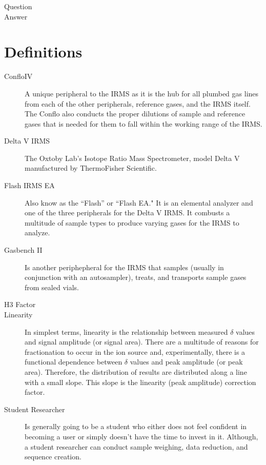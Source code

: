 \documentclass[12pt]{../SOP3}\usepackage[]{graphicx}\usepackage[]{color}
\begin{document}
\NP Question \\
Answer

\section{Definitions}

\begin{description}

\item[ConfloIV] A unique peripheral to the IRMS as it is the hub for all plumbed gas lines from each of the other peripherals, reference gases, and the IRMS itself. The Conflo also conducts the proper dilutions of sample and reference gases that is needed for them to fall within the working range of the IRMS.

\item[Delta V IRMS] \label{IRMS} The Oxtoby Lab's Isotope Ratio Mass Spectrometer, model Delta V manufactured by ThermoFisher Scientific. 

\item[Flash IRMS EA] Also know as the ``Flash'' or ``Flash EA." It is an elemental analyzer and one of the three peripherals for the Delta V IRMS. It combusts a multitude of sample types to produce varying gases for the IRMS to analyze. 

\item[Gasbench II] Is another periphepheral for the IRMS that samples (usually in conjunction with an autosampler), treats, and transports sample gases from sealed vials.

\item[H3 Factor]

\item[Linearity] In simplest terms, linearity is the relationship between measured $\delta$ values and signal amplitude (or signal area). There are a multitude of reasons for fractionation to occur in the ion source and, experimentally, there is a functional dependence between $\delta$ values and peak amplitude (or peak area). Therefore, the distribution of results are distributed along a line with a small slope. This slope is the linearity (peak amplitude) correction factor. 

\item[Student Researcher] Is generally going to be a student who either does not feel confident in becoming a user or simply doesn't have the time to invest in it. Although, a student researcher can conduct sample weighing, data reduction, and sequence creation.


\end{description}
\end{document}
